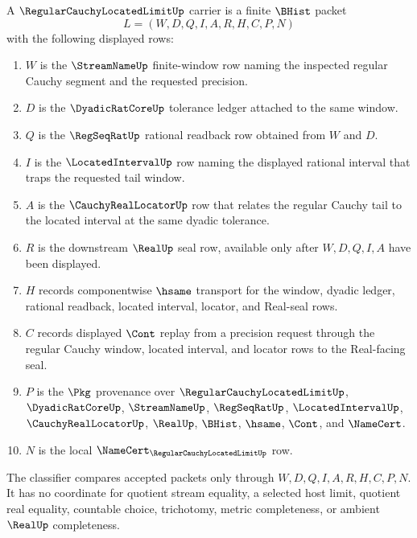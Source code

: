 \begin{definition}
\label{def:regular-cauchy-located-limit-carrier}
A $\RegularCauchyLocatedLimitUp$ carrier is a finite $\BHist$ packet
$$
L=(W,D,Q,I,A,R,H,C,P,N)
$$
with the following displayed rows:
\begin{enumerate}
\item $W$ is the $\StreamNameUp$ finite-window row naming the inspected regular Cauchy segment and the requested precision.
\item $D$ is the $\DyadicRatCoreUp$ tolerance ledger attached to the same window.
\item $Q$ is the $\RegSeqRatUp$ rational readback row obtained from $W$ and $D$.
\item $I$ is the $\LocatedIntervalUp$ row naming the displayed rational interval that traps the requested tail window.
\item $A$ is the $\CauchyRealLocatorUp$ row that relates the regular Cauchy tail to the located interval at the same dyadic tolerance.
\item $R$ is the downstream $\RealUp$ seal row, available only after $W,D,Q,I,A$ have been displayed.
\item $H$ records componentwise $\hsame$ transport for the window, dyadic ledger, rational readback, located interval, locator, and Real-seal rows.
\item $C$ records displayed $\Cont$ replay from a precision request through the regular Cauchy window, located interval, and locator rows to the Real-facing seal.
\item $P$ is the $\Pkg$ provenance over $\RegularCauchyLocatedLimitUp$, $\DyadicRatCoreUp$, $\StreamNameUp$, $\RegSeqRatUp$, $\LocatedIntervalUp$, $\CauchyRealLocatorUp$, $\RealUp$, $\BHist$, $\hsame$, $\Cont$, and $\NameCert$.
\item $N$ is the local $\NameCert_{\RegularCauchyLocatedLimitUp}$ row.
\end{enumerate}
The classifier compares accepted packets only through $W,D,Q,I,A,R,H,C,P,N$. It has no coordinate for quotient stream equality, a selected host limit, quotient real equality, countable choice, trichotomy, metric completeness, or ambient $\RealUp$ completeness.
\end{definition}

